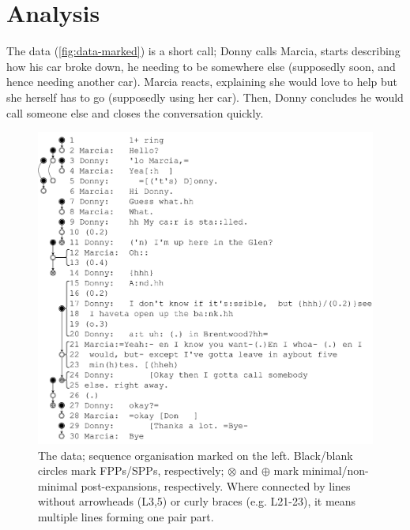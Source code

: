 \documentclass[11pt]{article}
\begin{document}
\section*{Analysis}{
	The data (\autoref{fig:data-marked}) is a short call; Donny calls Marcia, starts describing how his car broke down, he needing to be somewhere else (supposedly soon, and hence needing another car). Marcia reacts, explaining she would love to help but she herself has to go (supposedly using her car). Then, Donny concludes he would call someone else and closes the conversation quickly.

	\begin{figure}[h!tb]
		\centering
		\includegraphics[width=\columnwidth]{../data-marked.pdf}
		\caption{The data; sequence organisation marked on the left. Black/blank circles mark FPPs/SPPs, respectively; $\boldsymbol{\mathbf{\otimes}}$ and $\boldsymbol{\mathbf{\oplus}}$ mark minimal/non-minimal post-expansions, respectively. Where connected by lines without arrowheads (L3,5) or curly braces (e.g. L21-23), it means multiple lines forming one pair part.}
		\label{fig:data-marked}
	\end{figure}

}
\end{document}
